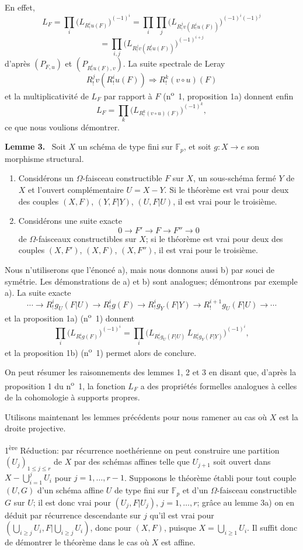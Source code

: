\documentclass[11pt]{article}
\newenvironment{statement}[1]{\par\medskip\noindent\textbf{#1.}\ }{\par\medskip}
\begin{document}
En effet,
\[
L_F=\prod_i\bigl(L_{R^i_!u(F)}\bigr)^{(-1)^i}
 =\prod_i\prod_j\bigl(L_{R^j_!v(R^i_!u(F))}\bigr)^{(-1)^i(-1)^j}
\]
\[
=\prod_{i,j}\bigl(L_{R^j_!v(R^i_!u(F))}\bigr)^{(-1)^{i+j}}
\]
d'après $(P_{F,u})$ et $(P_{R^i_!u(F),v})$. La suite spectrale de Leray
\[
R^j_!v(R^i_!u(F))\Longrightarrow R^k_!(v\circ u)(F)
\]
et la multiplicativité de $L_F$ par rapport à $F$ (n\textsuperscript{o}~1, proposition 1a) donnent enfin
\[
L_F=\prod_k\bigl(L_{R^k_!(v\circ u)(F)}\bigr)^{(-1)^k},
\]
ce que nous voulions démontrer.

\begin{statement}{Lemme 3}
Soit $X$ un schéma de type fini sur $\mathbb F_p$, et soit $g:X\to e$ son morphisme structural.
\begin{enumerate}[label=\alph*)]
\item Considérons un $\Omega$-faisceau constructible $F$ sur $X$, un sous-schéma fermé $Y$ de $X$ et l'ouvert complémentaire $U=X-Y$. Si le théorème est vrai pour deux des couples $(X,F)$, $(Y,F|Y)$, $(U,F|U)$, il est vrai pour le troisième.
\item Considérons une suite exacte
\[
0\longrightarrow F'\longrightarrow F\longrightarrow F''\longrightarrow0
\]
de $\Omega$-faisceaux constructibles sur $X$; si le théorème est vrai pour deux des couples $(X,F')$, $(X,F)$, $(X,F'')$, il est vrai pour le troisième.
\end{enumerate}
\end{statement}

Nous n'utiliserons que l'énoncé a), mais nous donnons aussi b) par souci de symétrie. Les démonstrations de a) et b) sont analogues; démontrons par exemple a). La suite exacte
\[
\cdots\longrightarrow R^i_!g_U(F|U)\longrightarrow R^i_!g(F)
\longrightarrow R^i_!g_Y(F|Y)\longrightarrow R^{i+1}_!g_U(F|U)\longrightarrow\cdots
\]
et la proposition 1a) (n\textsuperscript{o}~1) donnent
\[
\prod_i\bigl(L_{R^i_!g(F)}\bigr)^{(-1)^i}
=\prod_i\bigl(L_{R^i_!g_U(F|U)}\,L_{R^i_!g_Y(F|Y)}\bigr)^{(-1)^i},
\]
et la proposition 1b) (n\textsuperscript{o}~1) permet alors de conclure.

On peut résumer les raisonnements des lemmes 1, 2 et 3 en disant que, d'après la proposition 1 du n\textsuperscript{o}~1, la fonction $L_F$ a des propriétés formelles analogues à celles de la cohomologie à supports propres.

Utilisons maintenant les lemmes précédents pour nous ramener au cas où $X$ est la droite projective.

1\textsuperscript{ère} Réduction: par récurrence noethérienne on peut construire une partition $(U_j)_{1\le j\le r}$ de $X$ par des schémas affines telle que $U_{j+1}$ soit ouvert dans $X-\bigcup_{i=1}^jU_i$ pour $j=1,\ldots,r-1$. Supposons le théorème établi pour tout couple $(U,G)$ d'un schéma affine $U$ de type fini sur $\mathbb F_p$ et d'un $\Omega$-faisceau constructible $G$ sur $U$; il est donc vrai pour $(U_j,F|U_j)$, $j=1,\ldots,r$; grâce au lemme 3a) on en déduit par récurrence descendante sur $j$ qu'il est vrai pour $(\bigcup_{i\ge j}U_i,F|\bigcup_{i\ge j}U_i)$, donc pour $(X,F)$, puisque $X=\bigcup_{i\ge1}U_i$. Il suffit donc de démontrer le théorème dans le cas où $X$ est affine.
\end{document}
